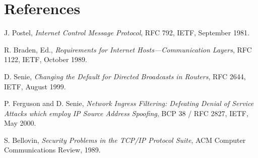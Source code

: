 \documentclass[12pt,a4paper]{article}
\begin{document}
\section{References}
\begin{enumerate}[label={[\arabic*]}]
\item J. Postel, \textit{Internet Control Message Protocol}, RFC 792, IETF, September 1981.
\item R. Braden, Ed., \textit{Requirements for Internet Hosts---Communication Layers}, RFC 1122, IETF, October 1989.
\item D. Senie, \textit{Changing the Default for Directed Broadcasts in Routers}, RFC 2644, IETF, August 1999.
\item P. Ferguson and D. Senie, \textit{Network Ingress Filtering: Defeating Denial of Service Attacks which employ IP Source Address Spoofing}, BCP 38 / RFC 2827, IETF, May 2000.
\item S. Bellovin, \textit{Security Problems in the TCP/IP Protocol Suite}, ACM Computer Communications Review, 1989.
\end{enumerate}

\vfill
\end{document}
